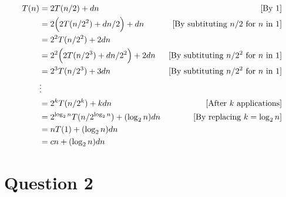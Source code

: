 \documentclass[12pt]{article}
\begin{document}
\begin{itemize}
\begin{mdframed}
        \begin{align}
            T(n) &= 2T(n/2) + dn & [\text{By 1}]\\
            &= 2\Bigl(2T(n/2^2) + dn/2\Bigr) + dn & [\text{By subtituting $n/2$ for $n$ in 1}]\\
            &= 2^2T(n/2^2) + 2dn\\
            &= 2^2\Bigl(2T(n/2^3) + dn/2^2\Bigr) + 2dn & [\text{By subtituting $n/2^2$ for $n$ in 1}]\\
            &= 2^3T(n/2^3) + 3dn & [\text{By subtituting $n/2^2$ for $n$ in 1}]\\
            &\vdots\\
            &= 2^kT(n/2^k) + kdn & [\text{After $k$ applications}]\\
            &= 2^{\log_2 n}T(n/2^{\log_2 n}) + (\log_2 n)dn & [\text{By replacing $k = \log_2 n$}]\\
            &= nT(1) + (\log_2 n)dn\\
            &= cn + (\log_2 n)dn
        \end{align}

        \bigskip

    \end{mdframed}

\end{itemize}

\section*{Question 2}
\end{document}
